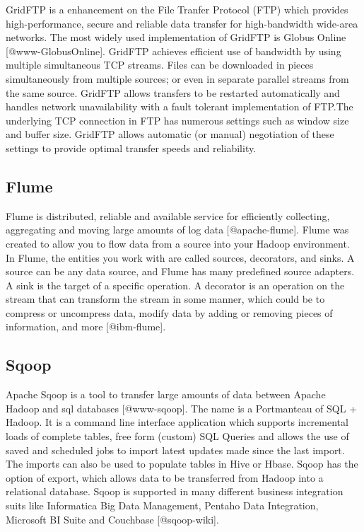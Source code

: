 GridFTP is a enhancement on the File Tranfer Protocol (FTP) which
provides high-performance, secure and reliable data transfer for
high-bandwidth wide-area networks. The most widely used implementation
of GridFTP is Globus Online [@www-GlobusOnline]. GridFTP achieves
efficient use of bandwidth by using multiple simultaneous TCP streams.
Files can be downloaded in pieces simultaneously from multiple
sources; or even in separate parallel streams from the same
source. GridFTP allows transfers to be restarted automatically and
handles network unavailability with a fault tolerant implementation of
FTP.The underlying TCP connection in FTP has numerous settings such as
window size and buffer size. GridFTP allows automatic (or manual)
negotiation of these settings to provide optimal transfer speeds and
reliability.




\subsection{Flume}

Flume is distributed, reliable and available service for efficiently
collecting, aggregating and moving large amounts of log
data [@apache-flume]. Flume was created to allow you to flow data
from a source into your Hadoop environment.  In Flume, the entities
you work with are called sources, decorators, and sinks. A source can
be any data source, and Flume has many predefined source adapters. A
sink is the target of a specific operation. A decorator is an
operation on the stream that can transform the stream in some manner,
which could be to compress or uncompress data, modify data by adding
or removing pieces of information, and more [@ibm-flume].

\subsection{Sqoop}
     
Apache Sqoop is a tool to transfer large amounts of data between
Apache Hadoop and sql databases [@www-sqoop]. The name is a
Portmanteau of SQL + Hadoop. It is a command line interface
application which supports incremental loads of complete tables, free
form (custom) SQL Queries and allows the use of saved and scheduled
jobs to import latest updates made since the last import. The imports
can also be used to populate tables in Hive or Hbase. Sqoop has the
option of export, which allows data to be transferred from Hadoop into
a relational database. Sqoop is supported in many different business
integration suits like Informatica Big Data Management, Pentaho Data
Integration, Microsoft BI Suite and Couchbase [@sqoop-wiki].

